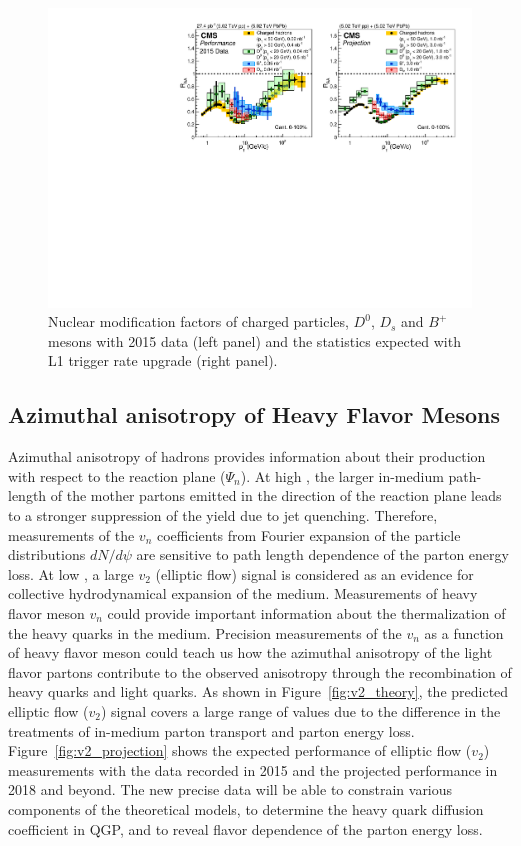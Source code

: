 \begin{figure}[!ht]
\begin{center}
\includegraphics[width=.98\textwidth]{figures/cRAA_lumiTG_3_lumiMB_1_v2.pdf}
\caption{Nuclear modification factors of charged particles, $D^0$, $D_s$ and $B^+$ mesons with 2015 data (left panel) and the statistics expected with L1 trigger rate upgrade (right panel).}
\label{fig:RAA_2015}
\end{center}
\end{figure}

\subsection{Azimuthal anisotropy of Heavy Flavor Mesons}

Azimuthal anisotropy of hadrons provides information about their production with respect to the reaction plane ($\Psi_n$). At high \pt, the larger in-medium path-length of the mother partons emitted in the direction of the reaction plane leads to a stronger suppression of the yield due to jet quenching. Therefore, measurements of the $v_n$ coefficients from Fourier expansion of the particle distributions $dN/d\psi$ are sensitive to path length dependence of the parton energy loss. At low \pt, a large $v_2$ (elliptic flow) signal is considered as an evidence for collective hydrodynamical expansion of the medium. Measurements of heavy flavor meson $v_n$ could provide important information about the thermalization of the heavy quarks in the medium. Precision measurements of the $v_n$ as a function of heavy flavor meson \pt could teach us how the azimuthal anisotropy of the light flavor partons contribute to the observed anisotropy through the recombination of heavy quarks and light quarks. As shown in Figure~\ref{fig:v2_theory}, the predicted elliptic flow ($v_2$) signal covers a large range of values due to the difference in the treatments of in-medium parton transport and parton energy loss. Figure~\ref{fig:v2_projection} shows the expected performance of elliptic flow ($v_2$) measurements with the data recorded in 2015 and the projected performance in 2018 and beyond. The new precise data will be able to constrain various components of the theoretical models, to determine the heavy quark diffusion coefficient in QGP, and to reveal flavor dependence of the parton energy loss.


